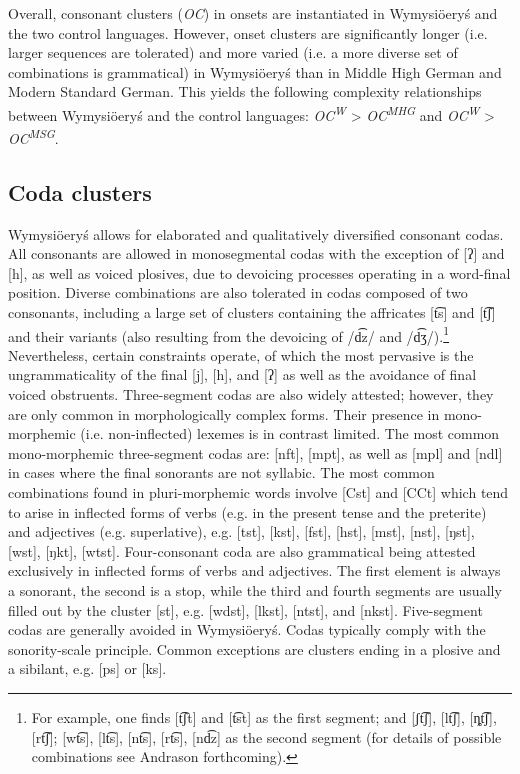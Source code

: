 \documentclass[output=paper]{langscibook}
\begin{document}
Overall, consonant clusters (\textit{OC}) in onsets are instantiated in Wymysiöeryś and the two control languages. However, onset clusters are significantly longer (i.e. larger sequences are tolerated) and more varied (i.e. a more diverse set of combinations is grammatical) in Wymysiöeryś than in Middle High German and Modern Standard German. This yields the following complexity relationships between Wymysiöeryś and the control languages: \textit{OC\textsuperscript{W}} > \textit{OC\textsuperscript{MHG}} and \textit{OC\textsuperscript{W}} > \textit{OC\textsuperscript{MSG}}.

\subsection{Coda clusters}\label{sec:wymsorys:3.12}

Wymysiöeryś allows for elaborated and qualitatively diversified consonant codas. All consonants are allowed in monosegmental codas with the exception of [ʔ] and [h], as well as voiced plosives, due to devoicing processes operating in a word-final position. Diverse combinations are also tolerated in codas composed of two consonants, including a large set of clusters containing the affricates [t͡s] and [t͡ʃ] and their variants (also resulting from the devoicing of /d͡z/ and /d͡ʒ/).\footnote{For example, one finds [t͡ʃt] and [t͡st] as the first segment; and [ʃt͡ʃ], [lt͡ʃ], [ȵt͡ʃ], [rt͡ʃ]; [wt͡s], [lt͡s], [nt͡s], [rt͡s], [nd͡z] as the second segment (for details of possible combinations see Andrason forthcoming).} Nevertheless, certain constraints operate, of which the most pervasive is the ungrammaticality of the final [j], [h], and [ʔ] as well as the avoidance of final voiced obstruents. Three-segment codas are also widely attested; however, they are only common in morphologically complex forms. Their presence in mono-morphemic (i.e. non-inflected) lexemes is in contrast limited. The most common mono-morphemic three-segment codas are: [nft], [mpt], as well as [mpl] and [ndl] in cases where the final sonorants are not syllabic. The most common combinations found in pluri-morphemic words involve [Cst] and [CCt] which tend to arise in inflected forms of verbs (e.g. in the present tense and the preterite) and adjectives (e.g. superlative), e.g. [tst], [kst], [fst], [hst], [mst], [nst], [ŋst], [wst], [ŋkt], [wtst]. Four-consonant coda are also grammatical being attested exclusively in inflected forms of verbs and adjectives. The first element is always a sonorant, the second is a stop, while the third and fourth segments are usually filled out by the cluster [st], e.g. [wdst], [lkst], [ntst], and [nkst]. Five-segment codas are generally avoided in Wymysiöeryś. Codas typically comply with the sonority-scale principle. Common exceptions are clusters ending in a plosive and a sibilant, e.g. [ps] or [ks].
\end{document}
